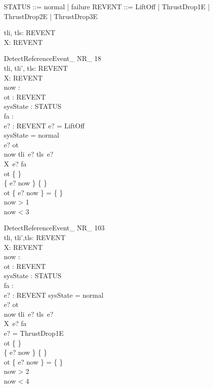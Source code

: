 \begin{zed}
STATUS ::= normal | failure \also
REVENT ::= LiftOff | ThrustDrop1E | ThrustDrop2E | ThrustDrop3E
\end{zed}

\begin{axdef}
tli, tls: REVENT \fun \nat \\
X: REVENT \fun \nat 
\end{axdef}

\begin{schema}{DetectReferenceEvent\_ NR\_ 18}\\
tli, tli', tls: REVENT \fun \nat \\
X: REVENT \fun \nat \\
 now : \nat \\
 ot : REVENT \pfun \nat \\
 sysState : STATUS \\
 fa : \nat \\
 e? : REVENT 
\where
 e? = LiftOff \\
 sysState = normal \\
 e? \notin \dom ot \\
 now \in tli~e? \upto tls~e? \\
 X~e? \leq fa \\
 ot \neq \{ \} \\
 \{ e? \mapsto now \} \neq \{ \} \\
 ot \cap \{ e? \mapsto now \} = \{ \} \\
 now > 1 \\
 now < 3
\end{schema}

\begin{schema}{DetectReferenceEvent\_ NR\_ 103}\\
tli, tli',tls: REVENT \fun \nat \\
X: REVENT \fun \nat \\
 now : \nat \\
 ot : REVENT \pfun \nat \\
 sysState : STATUS \\
 fa : \nat \\
 e? : REVENT 
\where
 sysState = normal \\
 e? \notin \dom ot \\
 now \in tli~e? \upto tls~e? \\
 X~e? \geq fa \\
 e? = ThrustDrop1E \\
 ot \neq \{ \} \\
 \{ e? \mapsto now \} \neq \{ \} \\
 ot \cap \{ e? \mapsto now \} = \{ \} \\
 now > 2 \\
 now < 4
\end{schema}

